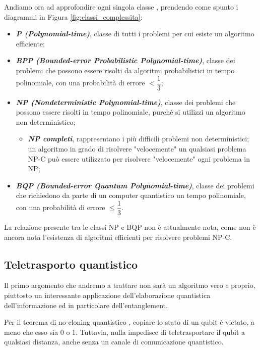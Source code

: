 Andiamo ora ad approfondire ogni singola classe \cite{dipierro2013articolo}, prendendo come spunto i diagrammi in Figura \ref{fig:classi_complessita}:
\begin{itemize}
    \renewcommand\labelitemi{--}
    \item \textbf{\textit{P (Polynomial-time)}}, classe di tutti i problemi per cui esiste un algoritmo efficiente;
    \item \textbf{\textit{BPP (Bounded-error Probabilistic Polynomial-time)}}, classe dei problemi che possono essere risolti da algoritmi probabilistici in tempo polinomiale, con una probabilità di errore $<\dfrac{1}{3}$;
    \item \textbf{\textit{NP (Nondeterministic Polynomial-time)}}, classe dei problemi che possono essere risolti in tempo polinomiale, purché si utilizzi un algoritmo non deterministico;
    \begin{itemize}
        \item \textbf{\textit{NP completi}}, rappresentano i più difficili problemi non deterministici; un algoritmo in grado di risolvere "velocemente" un qualsiasi problema NP-C può essere utilizzato per risolvere "velocemente" ogni problema in NP;
    \end{itemize}
    \item \textbf{\textit{BQP (Bounded-error Quantum Polynomial-time)}}, classe dei problemi che richiedono da parte di un computer quantistico un tempo polinomiale, con una probabilità di errore $\leq\dfrac{1}{3}$.
\end{itemize}

La relazione presente tra le classi NP e BQP non è attualmente nota, come non è ancora nota l'esistenza di algoritmi efficienti per risolvere problemi NP-C.

\subsection{Teletrasporto quantistico}
Il primo argomento che andremo a trattare non sarà un algoritmo vero e proprio, piuttosto un interessante applicazione dell'elaborazione quantistica dell'informazione ed in particolare dell'entanglement.

Per il teorema di no-cloning quantistico \cite{wootters1982articolo}, copiare lo stato di un qubit è vietato, a meno che esso sia 0 o 1.
Tuttavia, nulla impedisce di teletrasportare \cite{cambridge2010book} il qubit a qualsiasi distanza, anche senza un canale di comunicazione quantistico.

